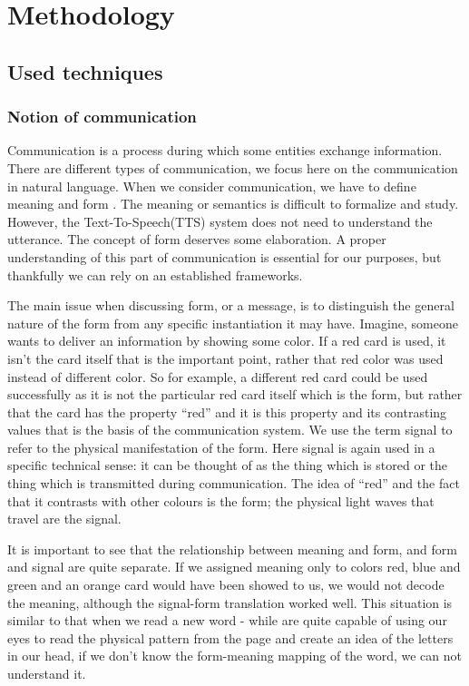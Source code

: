 \chapter{Methodology}
\section{Used techniques}
\subsection{Notion of communication}
Communication is a process during which some entities exchange information.
There are different types of communication, we focus here on the communication in natural language.
When we consider communication, we have to define meaning and form \cite{taylor2009text}.
The meaning or semantics is difficult to formalize and study.
However, the Text-To-Speech(TTS) system does not need to understand the utterance.
The concept of form deserves some elaboration.
A proper understanding of this part of communication is essential for our purposes, but thankfully we can rely on an established frameworks.
\par
The main issue when discussing form, or a message, is to distinguish the general nature of the form from
any specific instantiation it may have.
Imagine, someone wants to deliver an information by showing some color.
If a red card is used, it isn’t the card itself that is the important point, rather that red color was used instead of different color.
So for example, a different red card could be used successfully  as it
is not the particular red card itself which is the form, but rather that the card has the property “red”
and it is this property and its contrasting values that is the basis of the communication system.
We use the term signal to refer to the physical manifestation of the form.
Here signal is again used in a specific technical sense: it can be thought of as the thing which is stored or the
thing which is transmitted during communication.
The idea of “red” and the fact that it contrasts with other colours is the form; the physical light waves that travel are the signal.
\par
It is important to see that the relationship between meaning and form, and form and signal
are quite separate.
If we assigned meaning only to colors red, blue and green and an orange card would have been showed to us, we would not decode the meaning, although the signal-form translation worked well.
This situation is similar to that when we read a new word - while are quite capable of using our eyes to read the physical pattern from the page and create an idea of the letters in our head, if we don’t know the form-meaning mapping of the word, we can not understand it.
